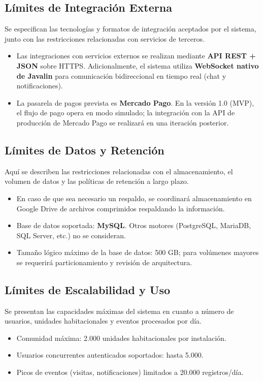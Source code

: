 \subsection{Límites de Integración Externa}
Se especifican las tecnologías y formatos de integración aceptados por el sistema, junto con las restricciones relacionadas con servicios de terceros.

\begin{itemize}
    \item Las integraciones con servicios externos se realizan mediante \textbf{API REST + JSON} sobre HTTPS. Adicionalmente, el sistema utiliza \textbf{WebSocket nativo de Javalin} para comunicación bidireccional en tiempo real (chat y notificaciones).
    \item La pasarela de pagos prevista es \textbf{Mercado Pago}. En la versión 1.0 (MVP), el flujo de pago opera en modo simulado; la integración con la API de producción de Mercado Pago se realizará en una iteración posterior.
\end{itemize}

\subsection{Límites de Datos y Retención}
Aquí se describen las restricciones relacionadas con el almacenamiento, el volumen de datos y las políticas de retención a largo plazo.

\begin{itemize}
    \item En caso de que sea necesario un respaldo, se coordinará almacenamiento en Google Drive de archivos comprimidos respaldando la información.
    \item Base de datos soportada: \textbf{MySQL}. Otros motores (PostgreSQL, MariaDB, SQL Server, etc.) no se consideran.
    \item Tamaño lógico máximo de la base de datos: 500 GB; para volúmenes mayores se requerirá particionamiento y revisión de arquitectura.
\end{itemize}

\subsection{Límites de Escalabilidad y Uso}
Se presentan las capacidades máximas del sistema en cuanto a número de usuarios, unidades habitacionales y eventos procesados por día.

\begin{itemize}
    \item Comunidad máxima: 2.000 unidades habitacionales por instalación.
    \item Usuarios concurrentes autenticados soportados: hasta 5.000.
    \item Picos de eventos (visitas, notificaciones) limitados a 20.000 registros/día.
\end{itemize}

